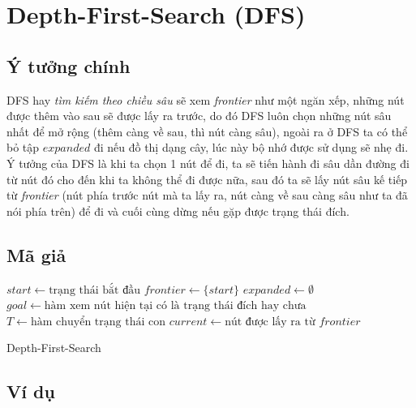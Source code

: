 \section{Depth-First-Search (DFS)}

\subsection{Ý tưởng chính}

DFS hay \textit{tìm kiếm theo chiều sâu} sẽ xem \textit{frontier} như một ngăn xếp, những nút được thêm vào sau sẽ được lấy ra trước, do đó DFS luôn chọn những nút sâu nhất để mở rộng (thêm càng về sau, thì nút càng sâu), ngoài ra ở DFS ta có thể bỏ tập $expanded$ đi nếu đồ thị dạng cây, lúc này bộ nhớ được sử dụng sẽ nhẹ đi. Ý tưởng của DFS là khi ta chọn 1 nút để đi, ta sẽ tiến hành đi sâu dần đường đi từ nút đó cho đến khi ta không thể đi được nữa, sau đó ta sẽ lấy nút sâu kế tiếp từ \textit{frontier} (nút phía trước nút mà ta lấy ra, nút càng về sau càng sâu như ta đã nói phía trên) để đi và cuối cùng dừng nếu gặp được trạng thái đích.

\subsection{Mã giả}

\begin{algorithm}[H]
  $start \gets \text{trạng thái bắt đầu}$\;
  $frontier \gets \{start\}$\; 
  $expanded \gets \emptyset$\;
  $goal \gets \text{hàm xem nút hiện tại có là trạng thái đích hay chưa}$\;
  $T \gets \text{hàm chuyển trạng thái con}$\;
  {
      $current \gets \text{nút được lấy ra từ $frontier$}$\;
      \;
      {
        \;
      }{
        {
            {
                \;
            }
        }
      }
  }
  \;
  \caption{Depth-First-Search}
  \label{algo:DFS}
\end{algorithm}

\subsection{Ví dụ}


